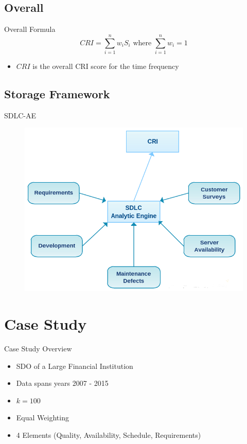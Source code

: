     \subsection{Overall}
        \begin{frame}{Overall Formula}
            \[
                CRI =\sum\limits^n_{i=1} w_i S_i 
                    \text{ where } \sum\limits^n_{i=1} w_i = 1
            \]
            
            \begin{itemize}
                \item $CRI$ is the overall CRI score for the time frequency
            \end{itemize}
        \end{frame} 

    \subsection{Storage Framework}
        \begin{frame}{SDLC-AE}
            \begin{figure}[ht]
                \centering
                \includegraphics[scale=.5]{images/sdlcae.png}
            \end{figure}
        \end{frame}

\section{Case Study}
        \begin{frame}{Case Study Overview}
            \begin{itemize}
                \item SDO of a Large Financial Institution
                \item Data spans years 2007 - 2015
                \item $k = 100$
                \item Equal Weighting
                \item 4 Elements (Quality, Availability, Schedule, Requirements)
            \end{itemize}
        \end{frame}
